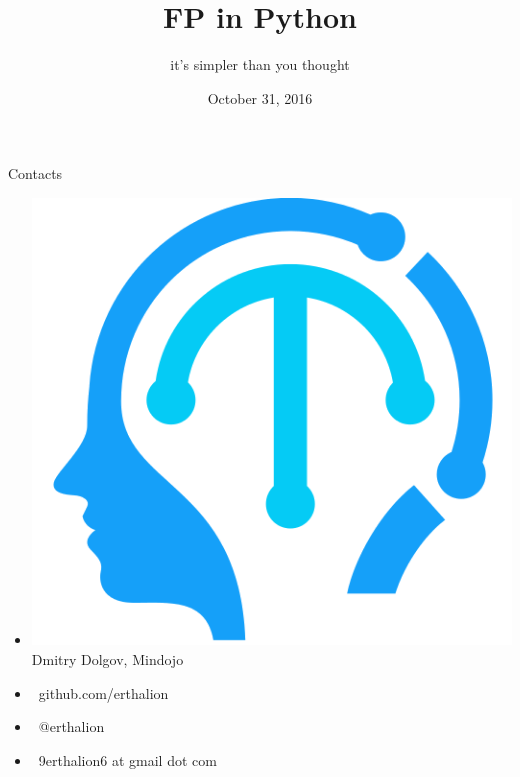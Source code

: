 \documentclass[18pt, compress]{beamer}
\title{FP in Python}
\subtitle{it's simpler than you thought}
\date{October 31, 2016}
\institute{}
\def\twitter{{\FA \faTwitter}}
\def\github{{\FA \faGithubSign}}
\def\email{{\FA \faEnvelope}}
\begin{document}
\fontsize{17pt}{18}\selectfont
\maketitle

\section{}

\begin{frame}{Contacts}
    \begin{itemize}[label={}]
        \item \includegraphics[scale=0.04]{mindojo_logo.png} Dmitry Dolgov, Mindojo
        \item {\github\ github.com/erthalion}
        \item {\twitter\ @erthalion}
        \item \email\ 9erthalion6 at gmail dot com
    \end{itemize}
\end{frame}
\end{document}
